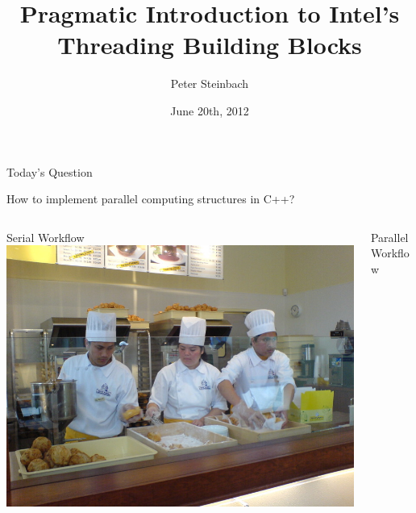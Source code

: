 \documentclass[9pt,pdftex]{beamer}
\begin{document}

\title[TBB]{ Pragmatic Introduction to Intel's Threading Building Blocks }
\author[P. Steinbach]{Peter Steinbach}
\date{June 20th, 2012}


\begin{frame}
  \begin{block}{Today's Question}
    \begin{center}
      How to implement parallel computing structures in C++?
    \end{center}
  \end{block}
  \vfill
  \begin{columns}[t]
    \begin{column}{.45\textwidth}
      \begin{block}{Serial Workflow}
        \includegraphics[width=.9\textwidth]{img/Cream_puff_assembly_line}
      \end{block}
    \end{column}
    \begin{column}{.45\textwidth}
      \begin{block}{Parallel  Workflow}

\end{block}
\end{column}
\end{columns}
\end{frame}
\end{document}
